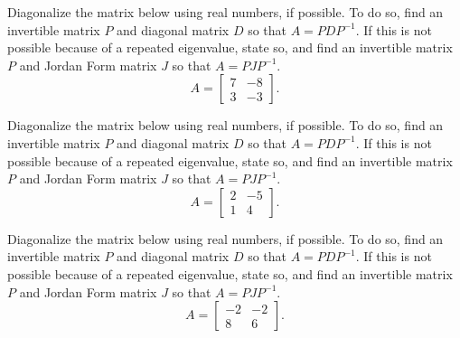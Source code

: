 \begin{exercise}\ansMark%
Diagonalize the matrix below using real numbers, if possible. To do so, find an invertible matrix $P$ and diagonal matrix $D$ so that $A = PDP^{-1}$. If this is not possible because of a repeated eigenvalue, state so, and find an invertible matrix $P$ and Jordan Form matrix $J$ so that $A = PJP^{-1}$. 
\[ A = \begin{bmatrix} 7 & -8 \\ 3 & -3 \end{bmatrix}.\]
\end{exercise} 
%

\begin{exercise}\ansMark%
Diagonalize the matrix below using real numbers, if possible. To do so, find an invertible matrix $P$ and diagonal matrix $D$ so that $A = PDP^{-1}$. If this is not possible because of a repeated eigenvalue, state so, and find an invertible matrix $P$ and Jordan Form matrix $J$ so that $A = PJP^{-1}$. 
\[ A = \begin{bmatrix} 2 & -5 \\ 1 & 4 \end{bmatrix}.\]
\end{exercise} 
%

\begin{exercise}\ansMark%
Diagonalize the matrix below using real numbers, if possible. To do so, find an invertible matrix $P$ and diagonal matrix $D$ so that $A = PDP^{-1}$. If this is not possible because of a repeated eigenvalue, state so, and find an invertible matrix $P$ and Jordan Form matrix $J$ so that $A = PJP^{-1}$. 
\[ A = \begin{bmatrix} -2 & -2 \\ 8 & 6 \end{bmatrix}.\]
\end{exercise} 
%

